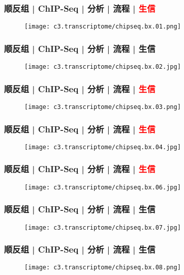 \begin{frame}
  \frametitle{顺反组 | ChIP-Seq | 分析 | 流程 | \textcolor{red}{生信}}
  \begin{figure}
    \centering
    \texttt{[image: c3.transcriptome/chipseq.bx.01.png]}
  \end{figure}
\end{frame}

\begin{frame}
  \frametitle{顺反组 | ChIP-Seq | 分析 | 流程 | 生信}
  \begin{figure}
    \centering
    \texttt{[image: c3.transcriptome/chipseq.bx.02.jpg]}
  \end{figure}
\end{frame}

\begin{frame}
  \frametitle{顺反组 | ChIP-Seq | 分析 | 流程 | \textcolor{red}{生信}}
  \begin{figure}
    \centering
    \texttt{[image: c3.transcriptome/chipseq.bx.03.png]}
  \end{figure}
\end{frame}

\begin{frame}
  \frametitle{顺反组 | ChIP-Seq | 分析 | 流程 | \textcolor{red}{生信}}
  \begin{figure}
    \centering
    \texttt{[image: c3.transcriptome/chipseq.bx.04.jpg]}
  \end{figure}
\end{frame}

\begin{frame}
  \frametitle{顺反组 | ChIP-Seq | 分析 | 流程 | \textcolor{red}{生信}}
  \begin{figure}
    \centering
    \texttt{[image: c3.transcriptome/chipseq.bx.06.jpg]}
  \end{figure}
\end{frame}

\begin{frame}
  \frametitle{顺反组 | ChIP-Seq | 分析 | 流程 | 生信}
  \begin{figure}
    \centering
    \texttt{[image: c3.transcriptome/chipseq.bx.07.jpg]}
  \end{figure}
\end{frame}

\begin{frame}
  \frametitle{顺反组 | ChIP-Seq | 分析 | 流程 | 生信}
  \begin{figure}
    \centering
    \texttt{[image: c3.transcriptome/chipseq.bx.08.png]}
  \end{figure}
\end{frame}

